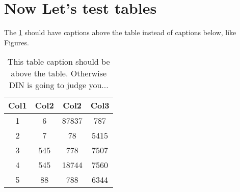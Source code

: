 \section{Now Let's test tables}%
The \cref{table:TestTableCaption} should have captions above the table instead of captions below, like Figures. \\%
%
\begin{table}[h!]%
	\centering%
	\caption{This table caption should be above the table. Otherwise DIN is going to judge you...}%
	\begin{tabular}{||c c c c||}%
		\hline%
		Col1 & Col2 & Col2 & Col3 \\ [0.5ex]%
		\hline\hline%
		1 & 6 & 87837 & 787 \\%
		2 & 7 & 78 & 5415 \\%
		3 & 545 & 778 & 7507 \\%
		4 & 545 & 18744 & 7560 \\%
		5 & 88 & 788 & 6344 \\ [1ex]%
		\hline%
	\end{tabular}%
	\label{table:TestTableCaption}%
\end{table}%
%
%
